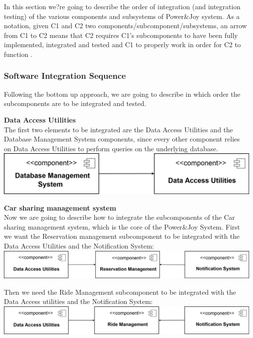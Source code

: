 \documentclass{article}
\begin{document}
\begin{flushleft}
In this section we?re going to describe the order of integration (and integration testing) of the various components and subsystems of Power\&Joy system. 
   As a notation, given C1 and C2 two components/subcomponent/subsystems, an arrow from C1 to C2 means that C2 requires C1's subcomponents  to have  been fully implemented, integrated and tested and C1 to properly work in order for C2 to function .\\
   
    
   
   
   
  
  \subsubsection{Software  Integration  Sequence}		%
  Following the bottom up approach, we are going to describe in which order the subcomponents are to be integrated and tested.
    \break \break
  
  \textbf{Data Access Utilities} \\
  The first two elements to be integrated are the Data Access Utilities and the Database Management System components, since every other component relies on Data Access Utilities to perform queries on the underlying database.\\
   \vspace{1cm}
  \includegraphics[scale=0.2]{Diagramma2}
    \break \break
    
    \textbf{Car sharing management system}\\
    Now we are going to describe how to integrate the subcomponents of the Car sharing management system, which is the core of the Power\&Joy System. 
    First we want the Reservation management subcomponent to be integrated with the Data Access Utilities and the Notification System:\\
 \vspace{1cm}
  \includegraphics[scale=0.15]{Diagramma3}
    
    \newpage
    Then we need the Ride Management subcomponent to be integrated with the Data Access utilities and the Notification System: \\
    \vspace{1cm}
  \includegraphics[scale=0.15]{Diagramma4}
    \break \break
    

\end{flushleft}
\end{document}
